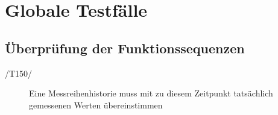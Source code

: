 \section{Globale Testfälle}

\subsection{Überprüfung der Funktionssequenzen}

\begin{description}
	\item[/T150/] Eine Messreihenhistorie muss mit zu diesem Zeitpunkt tatsächlich gemessenen Werten übereinstimmen
\end{description}